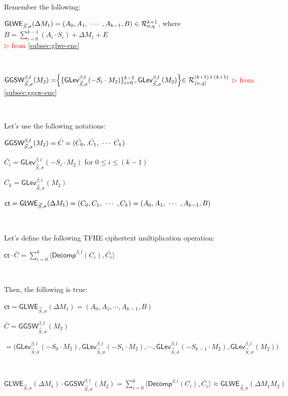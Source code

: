 $ $

\noindent Remember the following: 

$\textsf{GLWE}_{\vec{S}, \sigma}(\Delta M_1) = (A_0, A_1, \text{ } \text{$\cdots$} \text{ }, A_{k-1}, B) \in \mathcal{R}_{n, q}^{k + 1}$, where $B = \sum\limits_{i=0}^{k-1}(A_i \cdot S_i) + \Delta M_1 + E$ \\ \textcolor{red}{ $\rhd$ from \autoref{subsec:glwe-enc}} 

$ $

$\textsf{GGSW}_{\vec{S}, \sigma}^{\beta, l}(M_2) = \Bigr \{ \{ \textsf{GLev}_{\vec{S}, \sigma}^{\beta, l} (-S_i \cdot M_2)  \}_{i=0}^{k-1}, \textsf{GLev}_{\vec{S}, \sigma}^{\beta, l}(M_2) \Bigl \} \in \mathcal{R}_{\langle n, q \rangle }^{(k+1) \cdot l \cdot (k+1)}$ \textcolor{red}{ $\rhd$ from \autoref{subsec:ggsw-enc}}

$ $

\noindent Let's use the following notations:

$\textsf{GGSW}_{\vec{S}, \sigma}^{\beta, l}(M_2) = {\bar{C}} = (\bar{C_0},. \bar{C_1}, \text{ } \text{$\cdots$} \text{ } \bar{C_k})$ 

$\bar{C_i} = \textsf{GLev}_{\vec{S}, \sigma}^{\beta, l}(-S_i \cdot M_2)$ for $0 \leq i \leq (k-1)$

$\bar{C_k} = \textsf{GLev}_{\vec{S}, \sigma}^{\beta, l}(M_2)$

$\textsf{ct} = \textsf{GLWE}_{\vec{S}, \sigma}(\Delta M_1) = (C_0, C_1, \text{ } \text{$\cdots$} \text{ }, C_k) = (A_0, A_1, \text{ } \text{$\cdots$} \text{ }, A_{k-1}, B)$

$ $

\noindent Let's define the following TFHE ciphertext multiplication operation: 

$\textsf{ct} \cdot {\bar{C}} = \sum\limits_{i=0}^{k}\langle \textsf{Decomp}^{\beta, l}(C_i), \bar{C_i} \rangle$

$ $

\noindent Then, the following is true:

\begin{tcolorbox}[title={\textbf{\tboxlabel{\ref*{subsubsec:tfhe-glwe-to-ggsw-multiplication}} Generalization to GLWE-to-GGSW Multiplication}}]
$\textsf{ct} = \textsf{GLWE}_{\vec{S}, \sigma}(\Delta M_1) = (A_0, A_1, \cdots, A_{k-1}, B)$

$\bar{C} = \textsf{GGSW}_{\vec{S}, \sigma}^{\beta, l}(M_2)$

$ = \bm(\textsf{GLev}_{\vec{S}, \sigma}^{\beta, l}(-S_0\cdot M_2), \textsf{GLev}_{\vec{S}, \sigma}^{\beta, l}(-S_1\cdot M_2), \cdots, \textsf{GLev}_{\vec{S}, \sigma}^{\beta, l}(-S_{k-1}\cdot M_2), \textsf{GLev}_{\vec{S}, \sigma}^{\beta, l}(M_2)\bm)$

$ $

$\textsf{GLWE}_{\vec{S}, \sigma}(\Delta M_1) \cdot \textsf{GGSW}_{\vec{S}, \sigma}^{\beta, l}(M_2) = \sum\limits_{i=0}^{k}\langle \textsf{Decomp}^{\beta, l}(C_i), \bar{C_i} \rangle \approx \textsf{GLWE}_{\vec{S}, \sigma}(\Delta M_1 M_2)$
\end{tcolorbox}

